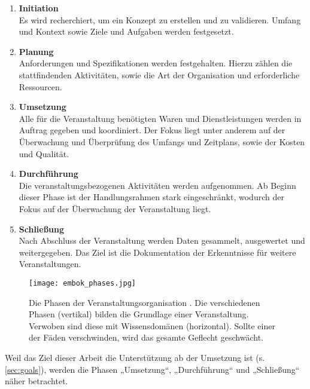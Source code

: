 \begin{enumerate}
    \setlength{\itemsep}{1em}
    \item \textbf{Initiation} \\
          Es wird recherchiert, um ein Konzept zu erstellen und zu validieren.
          Umfang und Kontext sowie Ziele und Aufgaben werden festgesetzt.
    \item \textbf{Planung} \\
          Anforderungen und Spezifikationen werden festgehalten. Hierzu zählen
          die stattfindenden Aktivitäten, sowie die Art der Organisation und
          erforderliche Ressourcen.
    \item \textbf{Umsetzung} \\
          Alle für die Veranstaltung benötigten Waren und Dienstleistungen
          werden in Auftrag gegeben und koordiniert. Der Fokus liegt unter
          anderem auf der Überwachung und Überprüfung des Umfangs und Zeitplans,
          sowie der Kosten und Qualität.
    \item \textbf{Durchführung} \\
          Die veranstaltungsbezogenen Aktivitäten werden aufgenommen. Ab Beginn
          dieser Phase ist der Handlungsrahmen stark eingeschränkt, wodurch der
          Fokus auf der Überwachung der Veranstaltung liegt.
    \item \textbf{Schließung} \\
          Nach Abschluss der Veranstaltung werden Daten gesammelt, ausgewertet
          und weitergegeben. Das Ziel ist die Dokumentation der Erkenntnisse für
          weitere Veranstaltungen.
\end{enumerate}

\begin{figure}[htpb]
    \centering
    \texttt{[image: embok\_phases.jpg]}
    \caption{Die Phasen der Veranstaltungsorganisation \cite{Silvers2013b}. Die
        verschiedenen Phasen (vertikal) bilden die Grundlage einer
        Veranstaltung. Verwoben sind diese mit Wissensdomänen (horizontal).
        Sollte einer der Fäden verschwinden, wird das gesamte Geflecht
        geschwächt.}
    \label{fig:embok-phases}
\end{figure}


Weil das Ziel dieser Arbeit die Unterstützung ab der Umsetzung ist (s.
\autoref{sec:goals}), werden die Phasen „Umsetzung“, „Durchführung“ und
„Schließung“ näher betrachtet.

